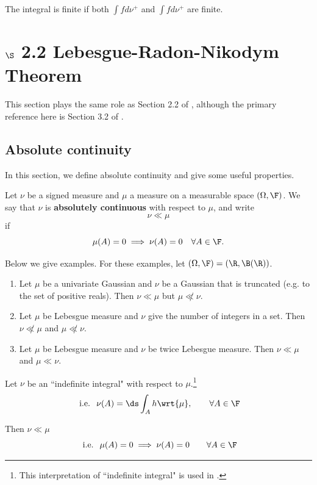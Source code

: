 \documentclass{article} %
\newif\ifActive
\newcommand{\dmu}{\wrt{\mu}}
\begin{document}
The integral is finite if both $\int f d\nu^+$ and $\int f d\nu^+$ are finite. 




\section{$\S$ 2.2 Lebesgue-Radon-Nikodym Theorem}

This section plays the same role as Section 2.2 of \cite{ash2000probability}, although the primary reference here is Section 3.2 of \cite{folland1999real}.

\subsection{Absolute continuity} \label{sec:absolute_continuity}

In this section, we define absolute continuity and give some useful properties.

\begin{definition}
Let $\nu$ be a signed measure and $\mu$ a measure on a measurable space $(\Omega, \F)$.  We say that $\nu$ is \textbf{absolutely continuous} with respect to $\mu$, and write
\[ \nu \ll \mu \]
if 
\[ \mu(A) = 0 \implies \nu(A) = 0 \quad \forall A \in \F. \]
\label{def:absolute_continuity}	
\end{definition}

\begin{example}

Below we give examples.  For these examples, let $(\Omega, \F) = (\R, \B(\R))$.

\ifActive
\textbf{Workshop Discussion:} Can you think of any examples?
\else 
	\begin{enumerate}
	\item Let $\mu$ be a univariate Gaussian and $\nu$ be a Gaussian that is truncated (e.g. to the set of positive reals).  Then $\nu \ll \mu$ but $\mu \not\ll \nu$.
	\item Let $\mu$ be Lebesgue measure and $\nu$ give the number of integers in a set.  Then $\nu \not\ll \mu$ and $\mu \not\ll \nu$.
	\item Let $\mu$ be Lebesgue measure and $\nu$ be twice Lebesgue measure.  Then $\nu \ll \mu$ and $\mu \ll \nu$.
	\end{enumerate}
\fi 
\label{ex:examples_with_absolute_continuity}
\end{example}


\begin{remark}{}

Let $\nu$ be an ``indefinite integral" with respect to $\mu$.\footnote{This interpretation of ``indefinite integral" is used in \cite[pp.~61]{ash2000probability}.}
\[ \text{ i.e. } \; \nu(A) = \ds\int_A h \dmu, \quad \quad \forall A \in \F \]

Then $\nu \ll \mu$
\[ \text{ i.e. } \; \mu(A) = 0 \implies \nu(A) = 0  \quad \quad \forall A \in \F \]
\label{rk:indefinite_integrals_are_absolutely_continuous}
\end{remark}
\end{document}
